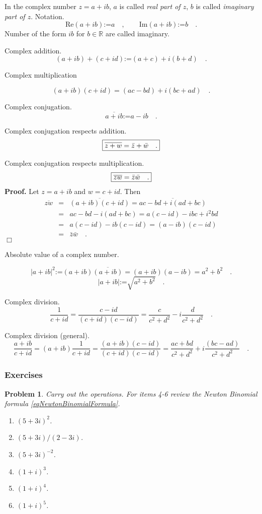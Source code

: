 \documentclass[12pt]{book}
\renewcommand{\Im}{\mathrm{Im}}
\renewcommand{\Re}{\mathrm{Re}}
\newcommand{\eqdef}{\textbf{:=}}
\newcommand{\importantFormula}[1]{\begin{equation} \boxed{#1} \end{equation}}
\newenvironment{proof}[1][]{ \textbf{Proof#1.} }{$\Box$\medskip}
\newtheorem{problem}{Problem}[section]
\begin{document}
In the complex number $z=a+ib$, $a$ is called \emph{real part of $z$}, $b$ is called \emph{imaginary part of $z$}. Notation.
\[
\Re (a+ib)\eqdef a \quad, \quad \quad \Im (a+ib)\eqdef b \quad .
\]
Number of the form $ib$ for $b\in \mathbb R$ are called imaginary.

Complex addition.
\[(a+i b)+ (c+id)\eqdef (a+c) + i(b+d) \quad .
\]

Complex multiplication 

\[
(a+ i b)(c+id)=(ac-bd)+i(bc+ad) \quad .
\]

 Complex conjugation.
\[\overline{a+ib}\eqdef a-ib \quad .
\]

Complex conjugation respects addition.
\importantFormula{
\label{eqComplexConjugationIsAddHMM} 
\overline {z +w}= \bar z +\bar w\quad .
}

Complex conjugation respects multiplication.
\importantFormula{
\label{eqComplexConjugationIsFieldHMM}  \overline {z w}= \bar z \bar w\quad .
}
\begin{proof}
Let $z= a+ib$ and $w=c+id$. Then
\begin{equation*}
\begin{array}{rcl}\overline {zw}&=& \overline{(a+ib)(c+id)}= \overline{ac-bd +i(ad+bc) }\\&=& ac-bd-i(ad+bc)= a(c-id)-ibc+i^{2}bd\\&=& a(c-id)-ib(c-id)= (a-ib)(c-id)\\&=&\bar z \bar w\quad .
\end{array}
\end{equation*}
\end{proof}

 Absolute value of a complex number.

\[
|a+ib|^2\eqdef (a+ib)\overline{(a+ib)}=(a+ib)(a-ib)=a^2+b^2 \quad .
\]
\[
|a+ib|\eqdef \sqrt{a^2+b^2}\quad .
\]

Complex division.
\[
\frac{1}{c+id}= \frac{c-id}{(c+id)(c-id)}=\frac{c}{c^2+d^2}-i\frac{d}{c^2+d^2} \quad .
\]

Complex division (general).
\[
\frac{a+ib}{c+id}=(a+ib)\frac{1}{c+id}= \frac{(a+ib)(c-id)}{(c+id)(c-id)}= \frac{ac+bd}{c^2+d^2}+i\frac{(bc-ad)}{c^2+d^2} \quad .
\]

\subsubsection{Exercises}
\begin{problem}
Carry out the operations. For items 4-6 review the Newton Binomial formula \eqref{eqNewtonBinomialFormula}.
\begin{enumerate}
\item $(5+3i)^2$.
\item $(5+3i)/(2-3i)$.
\item $(5+3i)^{-2}$.
\item $(1+i)^3$.
\item $(1+i)^4$.
\item $(1+i)^5$.
\end{enumerate}
\end{problem}
\end{document}
